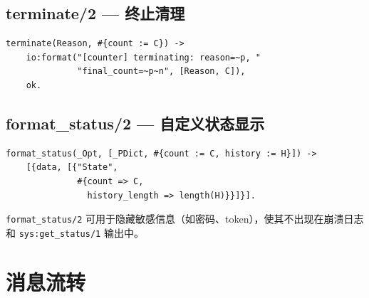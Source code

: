 \documentclass[a4paper,11pt]{article}
\begin{document}
\subsection{terminate/2 --- 终止清理}

\begin{lstlisting}[style=erlangstyle, caption={terminate/2 --- 进程终止时的清理}]
terminate(Reason, #{count := C}) ->
    io:format("[counter] terminating: reason=~p, "
              "final_count=~p~n", [Reason, C]),
    ok.
\end{lstlisting}

\subsection{format\_status/2 --- 自定义状态显示}

\begin{lstlisting}[style=erlangstyle, caption={format\_status/2 --- 自定义 sys:get\_status 输出}]
format_status(_Opt, [_PDict, #{count := C, history := H}]) ->
    [{data, [{"State",
              #{count => C,
                history_length => length(H)}}]}].
\end{lstlisting}

\begin{tipbox}[安全提示]
\texttt{format\_status/2} 可用于隐藏敏感信息（如密码、token），使其不出现在崩溃日志和 \texttt{sys:get\_status/1} 输出中。
\end{tipbox}


\section{消息流转}
\end{document}
